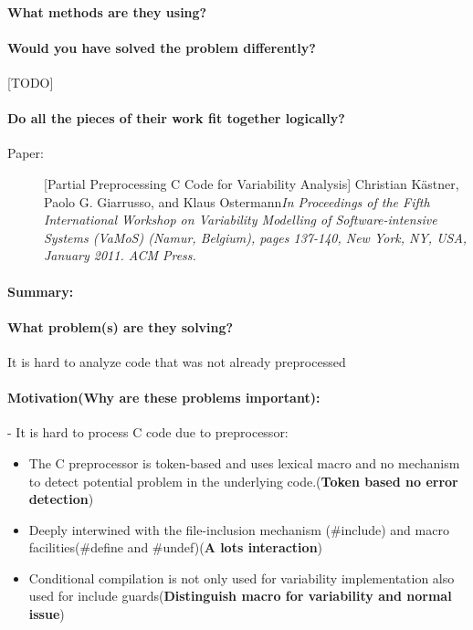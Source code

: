 \documentclass[12pt]{article}
\begin{document}
\paragraph{What methods are they using?}
\paragraph{Would you have solved the problem differently?}[TODO]
\paragraph{Do all the pieces of their work fit together logically?}




\clearpage
\begin{description}
\item[Paper:] [Partial Preprocessing C Code for Variability Analysis] Christian Kästner, Paolo G. Giarrusso, and Klaus Ostermann\emph{In Proceedings of the Fifth International Workshop on Variability Modelling of Software-intensive Systems (VaMoS) (Namur, Belgium), pages 137-140, New York, NY, USA, January 2011. ACM Press.} 
\end{description}

\paragraph{Summary:}
\paragraph{What problem(s) are they solving?} It is hard to analyze code that was not already preprocessed
\paragraph{Motivation(Why are these problems important):}	
- It is hard to process C code due to preprocessor:
	\begin{itemize}
		\item The C preprocessor is token-based and uses lexical macro and no mechanism to detect potential problem in the underlying code.(\textbf{Token based no error detection})
		\item  Deeply interwined with the file-inclusion mechanism (\#include) and macro facilities(\#define and \#undef)(\textbf{A lots interaction})
		\item Conditional compilation is not only used for variability implementation also used for include guards(\textbf{Distinguish macro for variability and normal issue})
	\end{itemize}
\end{document}
